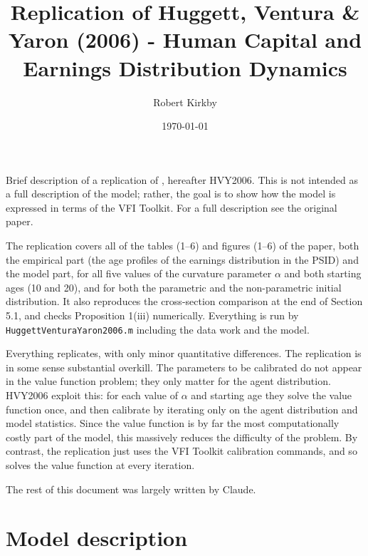 \documentclass[11pt,fleqn]{article}
\begin{document}
\newcommand{\rob}[1]{{\noindent\color{blue}\bf #1}}
\newcommand{\robc}[1]{{\noindent\color{blue}\bf R: #1}}

\title{Replication of Huggett, Ventura \& Yaron (2006) - Human Capital and Earnings Distribution Dynamics}
\author{Robert Kirkby}
\date{\today}
\maketitle

Brief description of a replication of \cite*{HuggettVenturaYaron2006}, hereafter HVY2006. This is not intended as a full description of the model; rather, the goal is to show how the model is expressed in terms of the VFI Toolkit. For a full description see the original paper.

The replication covers all of the tables (1--6) and figures (1--6) of the paper, both the empirical part (the age profiles of the earnings distribution in the PSID) and the model part, for all five values of the curvature parameter $\alpha$ and both starting ages (10 and 20), and for both the parametric and the non-parametric initial distribution. It also reproduces the cross-section comparison at the end of Section 5.1, and checks Proposition 1(iii) numerically. Everything is run by \verb|HuggettVenturaYaron2006.m| including the data work and the model.

Everything replicates, with only minor quantitative differences. The replication is in some sense substantial overkill. The parameters to be calibrated do not appear in the value function problem; they only matter for the agent distribution. HVY2006 exploit this: for each value of $\alpha$ and starting age they solve the value function once, and then calibrate by iterating only on the agent distribution and model statistics. Since the value function is by far the most computationally costly part of the model, this massively reduces the difficulty of the problem. By contrast, the replication just uses the VFI Toolkit calibration commands, and so solves the value function at every iteration.

The rest of this document was largely written by Claude.

\section{Model description}
\end{document}
